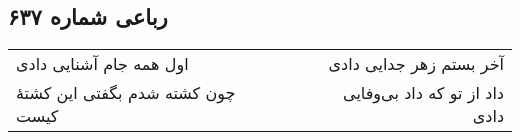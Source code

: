 \begin{center}
\section*{رباعی شماره ۶۳۷}
\label{sec:sh637}
\begin{longtable}{l p{0.5cm} r}
اول همه جام آشنایی دادی
&&
آخر بستم زهر جدایی دادی
\\
چون کشته شدم بگفتی این کشتهٔ کیست
&&
داد از تو که داد بی‌وفایی دادی
\\
\end{longtable}
\end{center}
